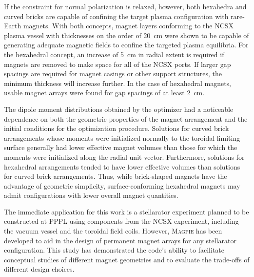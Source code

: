 \documentclass[11pt,onecolumn]{article}
\begin{document}
If the constraint for normal polarization is relaxed, however, both hexahedra
and curved bricks are capable of confining the target plasma configuration
with rare-Earth magnets. With both 
concepts, magnet layers conforming to the NCSX plasma vessel with thicknesses
on the order of 20~cm were shown to be capable of generating adequate magnetic
fields to confine the targeted plasma equilibria. For the hexahedral concept, 
an increase of 5~cm
in radial extent is required if magnets are removed to make space for all of
the NCSX ports. If larger gap spacings are required for magnet casings or 
other support structures, the minimum thickness will increase further.
In the case of hexahedral magnets, usable magnet arrays were found for
gap spacings of at least 2~cm.

The dipole moment distributions obtained by the optimizer had a noticeable
dependence on both the geometric properties of the magnet arrangement and
the initial conditions for the optimization procedure. Solutions for 
curved brick arrangements whose moments were initialized normally to the
toroidal limiting surface generally had lower effective magnet volumes than 
those for which the moments were initialized along the radial unit vector.
Furthermore, solutions for hexahedral arrangements tended to have lower 
effective volumes than solutions for curved brick arrangements.
Thus, while brick-shaped magnets have the advantage of geometric simplicity,
surface-conforming hexahedral magnets may admit configurations with lower
overall magnet quantities.

The immediate application for this work
is a stellarator experiment planned to be constructed at PPPL
using components from the NCSX experiment, including the vacuum vessel and 
the toroidal field coils. However, \textsc{Magpie} has been developed to 
aid in the design of permanent magnet arrays for any stellarator configuration.
This study has demonstrated the code's ability to facilitate conceptual
studies of different magnet geometries and to evaluate the trade-offs of
different design choices.
\end{document}
